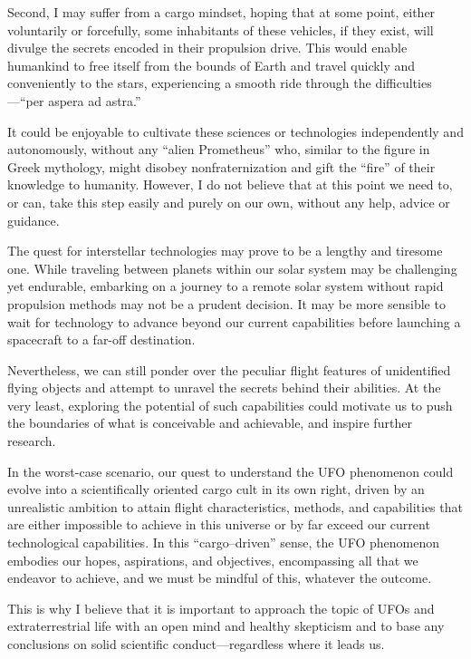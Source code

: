 Second, I may suffer from a cargo mindset, hoping that at some point, either voluntarily or forcefully,
some inhabitants of these vehicles, if they exist, will divulge the secrets encoded in their propulsion drive.
This would enable humankind to free itself from the bounds of Earth and travel quickly and conveniently to the stars,
experiencing a smooth ride through the difficulties---``per aspera ad astra.''

It could be enjoyable to cultivate these sciences or technologies independently and autonomously,
without any ``alien Prometheus'' who, similar to the figure in Greek mythology, might disobey nonfraternization and gift the ``fire''
of their knowledge  to humanity.
However, I do not believe that at this point we need to, or can, take this step easily and purely on our own, without any help, advice or guidance.

The quest for interstellar technologies may prove to be a lengthy and tiresome one.
While traveling between planets within our solar system may be challenging yet endurable,
embarking on a journey to a remote solar system without rapid propulsion methods may not be a prudent decision.
It may be more sensible to wait for technology to advance beyond our current capabilities before launching a
spacecraft to a far-off destination.

Nevertheless, we can still ponder over the peculiar flight features of unidentified flying objects
and attempt to unravel the secrets behind their abilities.
At the very least, exploring the potential of such capabilities could motivate us to push the boundaries of what is conceivable and achievable,
and inspire further research.

In the worst-case scenario, our quest to understand the UFO phenomenon could evolve into a scientifically oriented cargo cult
in its own right, driven by an unrealistic ambition to attain flight characteristics, methods,
and capabilities that are either impossible to achieve in this universe or by far exceed our current technological capabilities.
In this ``cargo--driven'' sense, the UFO phenomenon embodies our hopes, aspirations, and objectives, encompassing all that we endeavor to achieve,
and we must be mindful of this, whatever the outcome.


This is why I believe that it is important to approach the topic of UFOs and extraterrestrial life with an open mind and healthy skepticism and to base any conclusions on solid scientific conduct---regardless where it leads us.

